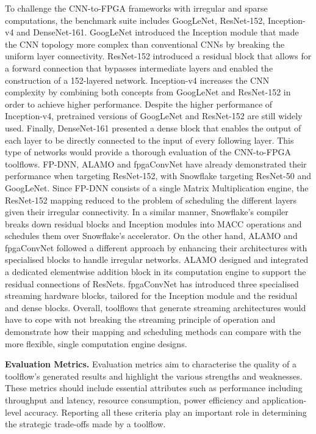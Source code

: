 \documentclass[format=acmsmall, review=false, screen=true]{acmart}
\begin{document}
To challenge the CNN-to-FPGA frameworks with irregular and sparse computations, the benchmark suite includes GoogLeNet, ResNet-152, Inception-v4 {\color{black}and DenseNet-161}. GoogLeNet introduced the Inception module that made the CNN topology more complex than conventional CNNs by breaking the uniform layer connectivity. ResNet-152 introduced a residual block that allows for a forward connection that bypasses intermediate layers and enabled the construction of a 152-layered network. Inception-v4 increases the CNN complexity by combining both concepts from GoogLeNet and ResNet-152 in order to achieve higher performance. Despite the higher performance of Inception-v4, pretrained versions of GoogLeNet and ResNet-152 are still widely used. {\color{black}Finally, DenseNet-161 presented a dense block that enables the output of each layer to be directly connected to the input of every following layer.} This type of networks would provide a thorough evaluation of the CNN-to-FPGA toolflows. FP-DNN, ALAMO and fpgaConvNet have already demonstrated their performance when targeting ResNet-152, with Snowflake targeting ResNet-50 and GoogLeNet. Since FP-DNN consists of a single Matrix Multiplication engine, the ResNet-152 mapping reduced to the problem of scheduling the different layers given their irregular connectivity. {\color{black}In a similar manner, Snowflake's compiler breaks down residual blocks and Inception modules into MACC operations and schedules them over Snowflake's accelerator. On the other hand, ALAMO and fpgaConvNet followed a different approach by enhancing their architectures with specialised blocks to handle irregular networks. ALAMO designed and integrated a dedicated elementwise addition block in its computation engine to support the residual connections of ResNets. fpgaConvNet has introduced three specialised streaming hardware blocks, tailored for the Inception module and the residual and dense blocks.} Overall, toolflows that generate streaming architectures would have to cope with not breaking the streaming principle of operation and demonstrate how their mapping and scheduling methods can compare with the more flexible, single computation engine designs. 

\textbf{Evaluation Metrics.}
\label{eval_metrics_sec}
Evaluation metrics aim to characterise the quality of a toolflow's generated results and highlight the various strengths and weaknesses. These metrics should include essential attributes such as performance including throughput and latency, resource consumption, power efficiency and application-level accuracy. Reporting all these criteria play an important role in determining the strategic trade-offs made by a toolflow.
\end{document}
